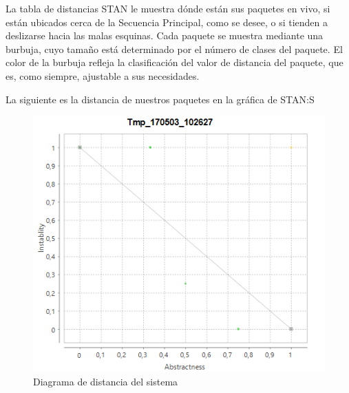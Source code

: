 La tabla de distancias STAN le muestra dónde están sus paquetes en vivo, si están ubicados cerca de la Secuencia Principal, como se desee, o si tienden a deslizarse hacia las malas esquinas. Cada paquete se muestra mediante una burbuja, cuyo tamaño está determinado por el número de clases del paquete. El color de la burbuja refleja la clasificación del valor de distancia del paquete, que es, como siempre, ajustable a sus necesidades\cite{Pw11D}.

La siguiente es la distancia de nuestros paquetes en la gráfica de STAN:S

\begin{figure}[H]
	\centering
	\includegraphics[width=0.7\linewidth]{parte2/imgs/Metricas/diagramaDistancia}
	\caption{Diagrama de distancia del sistema}
	\label{fig:distancia}
\end{figure}